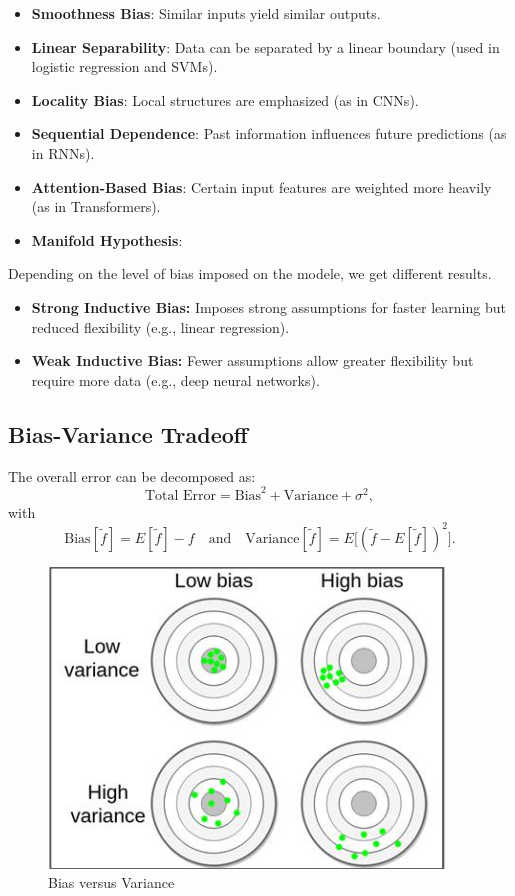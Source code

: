 \documentclass{article}
\begin{document}
\begin{itemize}
    \item \textbf{Smoothness Bias}: Similar inputs yield similar outputs.
    \item \textbf{Linear Separability}: Data can be separated by a linear boundary (used in logistic regression and SVMs).
    \item \textbf{Locality Bias}: Local structures are emphasized (as in CNNs).
    \item \textbf{Sequential Dependence}: Past information influences future predictions (as in RNNs).
    \item \textbf{Attention-Based Bias}: Certain input features are weighted more heavily (as in Transformers).
	\item \textbf{Manifold Hypothesis}:
\end{itemize}

Depending on the level of bias imposed on the modele, we get different results.

\begin{itemize}
    \item \textbf{Strong Inductive Bias:} Imposes strong assumptions for faster learning but reduced flexibility (e.g., linear regression).
    \item \textbf{Weak Inductive Bias:} Fewer assumptions allow greater flexibility but require more data (e.g., deep neural networks).
\end{itemize}

\subsection{Bias-Variance Tradeoff}
The overall error can be decomposed as:
\[
\text{Total Error} = \text{Bias}^2 + \text{Variance} + \sigma^2,
\]
with
\[
\text{Bias}[\tilde{f}] = E[\tilde{f}] - f \quad \text{and} \quad \text{Variance}[\tilde{f}] = E\big[(\tilde{f} - E[\tilde{f}])^2\big].
\]

\begin{figure}[ht]
    \centering
    \includegraphics[width=\linewidth]{graphics/biais-variance.png}
    \caption{Bias versus Variance}
    \label{fig:biais-variance}
\end{figure}
\end{document}
